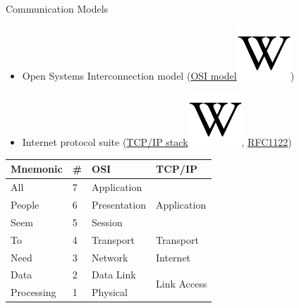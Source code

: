 \begin{frame}{Communication Models}
	\begin{itemize}[<+->]
		\item Open Systems Interconnection model (\href{https://en.wikipedia.org/wiki/OSI_model}{OSI model\includegraphics[scale=0.21]{../common/images/wiki_letter.png}})
		\item Internet protocol suite (\href{https://en.wikipedia.org/wiki/TCP/IP_stack}{TCP/IP stack\includegraphics[scale=0.21]{../common/images/wiki_letter.png}}, \href{https://tools.ietf.org/html/rfc1122}{RFC1122})
	\end{itemize}
	\begin{center}
	\begin{tabular}{|>{\onslide<4->}l<{\onslide<3->}|l|l|l|}
		\hline
		\textbf{Mnemonic}&  \textbf{\#} & \textbf{OSI} & \textbf{TCP/IP}              \\ \hline
		All              &  7           & Application  & \multirow{3}{*}{Application} \\ \cline{1-3}
		People           &  6           & Presentation &                              \\ \cline{1-3}
		Seem             &  5           & Session      &                              \\ \hline
		To               &  4           & Transport    & Transport                    \\ \hline
		Need             &  3           & Network      & Internet                     \\ \hline
		Data             &  2           & Data Link    & \multirow{2}{*}{Link Access} \\ \cline{1-3}
		Processing       &  1           & Physical     &                              \\ \hline
	\end{tabular}
	\end{center}
\end{frame}
